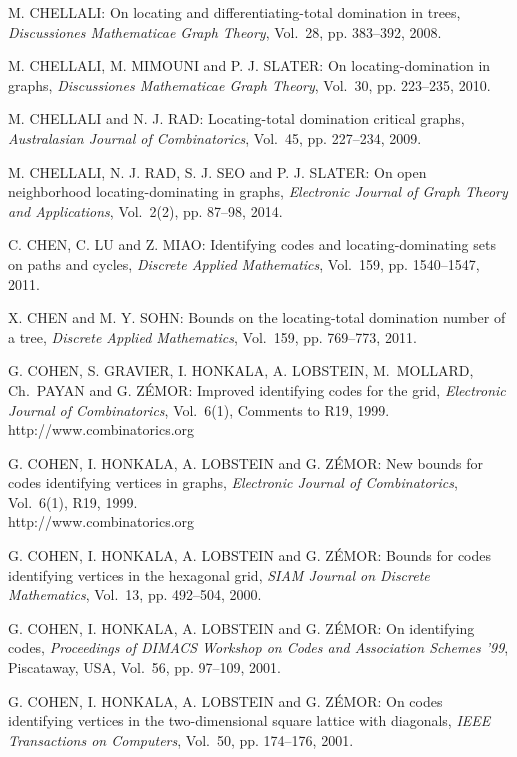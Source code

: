 \begin{thebibliography}{999}
M. CHELLALI: On locating and differentiating-total domination in trees, {\it Discussiones Mathematicae Graph Theory}, Vol.~28, pp. 383--392, 2008.

M. CHELLALI, M. MIMOUNI and P. J. SLATER: On locating-domination in graphs, {\it
Discussiones Mathematicae Graph Theory}, Vol.~30, pp. 223--235, 2010.

M. CHELLALI and N. J. RAD: Locating-total domination critical graphs, {\it Australasian Journal of Combinatorics}, Vol.~45, pp. 227--234, 2009.

M. CHELLALI, N. J. RAD, S. J. SEO and P. J. SLATER: On open neighborhood locating-dominating in graphs, {\it Electronic Journal of Graph Theory and Applications}, Vol.~2(2), pp. 87--98, 2014.

C. CHEN, C. LU and Z. MIAO: Identifying codes and locating-dominating sets on paths and cycles, {\it Discrete Applied Mathematics}, Vol.~159, pp. 1540--1547, 2011.

X. CHEN and M. Y. SOHN: Bounds on the locating-total domination number of a tree, {\it Discrete Applied Mathematics}, Vol.~159, pp. 769--773, 2011.

G. COHEN, S. GRAVIER, I. HONKALA, A. LOBSTEIN, M.~MOLLARD, Ch.~PAYAN and G. Z\'EMOR: Improved identifying codes for the grid, {\it Electronic Journal of Combinatorics}, Vol.~6(1), Comments to R19, 1999.\\
http://www.combinatorics.org

G. COHEN, I. HONKALA, A. LOBSTEIN and G. Z\'EMOR: New bounds for codes identifying vertices in graphs, {\it Electronic Journal of Combinatorics}, Vol.~6(1), R19, 1999.\\
http://www.combinatorics.org

G. COHEN, I. HONKALA, A. LOBSTEIN and G. Z\'EMOR: Bounds for codes identifying vertices in the hexagonal grid, {\it SIAM Journal on Discrete Mathematics}, Vol.~13, pp. 492--504, 2000.

G. COHEN, I. HONKALA, A. LOBSTEIN and G. Z\'EMOR: On identifying codes, {\it Proceedings of DIMACS Workshop on Codes and Association Schemes '99}, Piscataway, USA, Vol.~56, pp. 97--109, 2001.

G. COHEN, I. HONKALA, A. LOBSTEIN and G. Z\'EMOR: On codes identifying vertices in the two-dimensional square lattice with diagonals, {\it IEEE Transactions on Computers}, Vol.~50, pp. 174--176, 2001.


\end{thebibliography}
